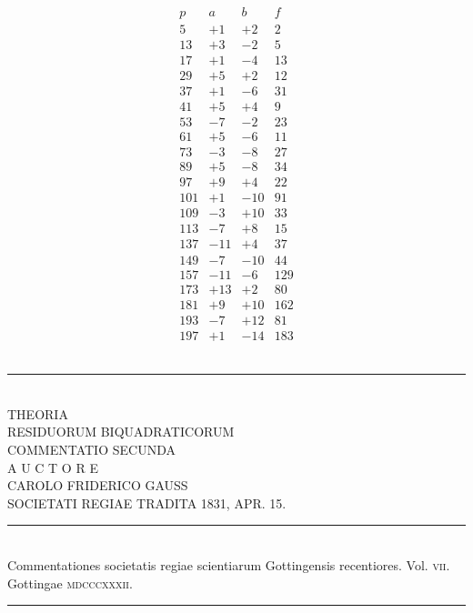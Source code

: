 \documentclass[twoside,12pt, showframe]{memoir}
\begin{document}
\[\begin{array}{r|r|r|r}
p & a & b & f \\
\hline
5 & +1 & +2 & 2 \\
13 & +3 & -2 & 5 \\
17 & +1& -4 & 13 \\
29 & +5 & +2 & 12 \\
37 & +1 & -6 & 31 \\
41 & +5 & +4 & 9 \\
53 & -7 & -2 & 23 \\
61 & +5 & -6 & 11 \\
73 & -3 & -8 & 27 \\
89 & +5 & -8 & 34 \\
97 & +9 & +4 & 22 \\
101 & +1 & -10 & 91 \\
109 & -3 & +10 & 33 \\
113 & -7 & +8 & 15 \\
137 & -11 & +4 & 37 \\
149 & -7 & -10 & 44 \\
157 & -11 & -6 & 129 \\
173 & +13 & +2 & 80 \\
181 & +9 & +10 & 162 \\
193 & -7 & +12 & 81 \\
197 & +1 & -14 & 183 
\end{array}\]\\[\baselineskip]
\begin{center} 
\rule{2in}{0.5pt}
\end{center}\clearpage\noindent%

\begin{center}
\;\\[4\baselineskip]
{\large THEORIA  }\\[\baselineskip]
{\LARGE RESIDUORUM BIQUADRATICORUM }\\[3\baselineskip]
{\large COMMENTATIO SECUNDA}\\[2.5\baselineskip]
{\tiny A U C T O R E}\\[1.5\baselineskip]
CAROLO FRIDERICO GAUSS\\[1.5\baselineskip]
{\scriptsize SOCIETATI REGIAE TRADITA {\tiny \textsc{1831},} APR. {\tiny \textsc{15}.}}\\[4\baselineskip]
\rule{4in}{0.5pt}\\[0.5\baselineskip]
{\small Commentationes societatis regiae scientiarum Gottingensis recentiores. Vol. \textsc{vii}.\\
Gottingae \textsc{mdcccxxxii}.}\\
\rule{4in}{0.5pt}
\end{center}
\clearpage\noindent%
\;
\clearpage\noindent%
\end{document}
